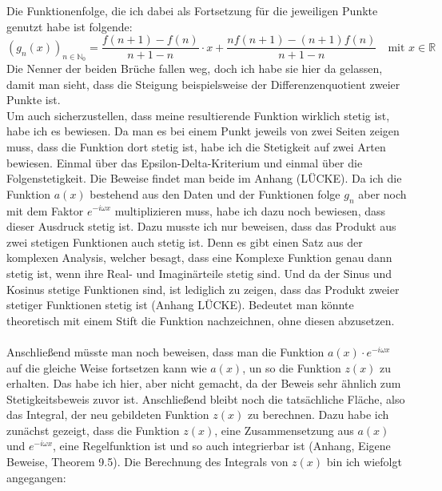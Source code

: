 \documentclass[a4paper,12pt]{article}
\theoremstyle{definition}
\theoremstyle{remark}
\begin{document}
\\ \\ \\ \\ \\ \\ \\
Die Funktionenfolge, die ich dabei als Fortsetzung für die jeweiligen Punkte genutzt habe ist folgende:
$$\left(g_n(x)\right)_{n\in \mathbb{N}_0} = \frac{f(n+1) - f(n)}{n+1 -n } \cdot x + \frac{nf(n+1) - (n+1)f(n)}{n+1 -n} \quad \text{mit } x\in\mathbb{R} $$
Die Nenner der beiden Brüche fallen weg, doch ich habe sie hier da gelassen, damit man sieht, dass 
die Steigung beispielsweise der Differenzenquotient zweier Punkte ist. 
\\ 
Um auch sicherzustellen, dass meine resultierende Funktion wirklich stetig ist, habe ich es bewiesen. 
Da man es bei einem Punkt jeweils von zwei Seiten zeigen muss, dass die Funktion dort stetig ist, habe ich die 
Stetigkeit auf zwei Arten bewiesen. Einmal über das Epsilon-Delta-Kriterium und einmal über die Folgenstetigkeit. 
Die Beweise findet man beide im Anhang (LÜCKE). Da ich die Funktion $a(x)$ bestehend aus den Daten und der Funktionen folge $g_n$ 
aber noch mit dem Faktor $e^{-i\omega x}$ multiplizieren muss, habe ich dazu noch bewiesen, dass dieser Ausdruck stetig ist. 
Dazu musste ich nur beweisen, dass das Produkt aus zwei stetigen Funktionen auch stetig ist. Denn es gibt einen 
Satz aus der komplexen Analysis, welcher besagt, dass eine Komplexe Funktion genau dann stetig ist, 
wenn ihre Real- und Imaginärteile stetig sind. Und da der Sinus und Kosinus stetige Funktionen sind, 
ist lediglich zu zeigen, dass das Produkt zweier stetiger Funktionen stetig ist (Anhang LÜCKE). Bedeutet man könnte 
theoretisch mit einem Stift die Funktion nachzeichnen, ohne diesen abzusetzen. 
\\ \\
Anschließend müsste man noch beweisen, dass man die Funktion $a(x)\cdot e^{-i\omega x}$ auf die gleiche Weise 
fortsetzen kann wie $a(x)$, un so die Funktion $z(x)$ zu erhalten. Das habe ich hier, aber nicht gemacht, da der 
Beweis sehr ähnlich zum Stetigkeitsbeweis zuvor ist. Anschließend bleibt noch die tatsächliche Fläche, also das 
Integral, der neu gebildeten Funktion $z(x)$ zu berechnen. Dazu habe ich zunächst gezeigt, dass die Funktion $z(x)$, eine 
Zusammensetzung aus $a(x)$ und $e^{-i\omega x}$, eine Regelfunktion ist und so auch integrierbar ist (Anhang, Eigene 
Beweise, Theorem 9.5). Die Berechnung des Integrals von $z(x)$ bin ich wiefolgt angegangen:
\end{document}
